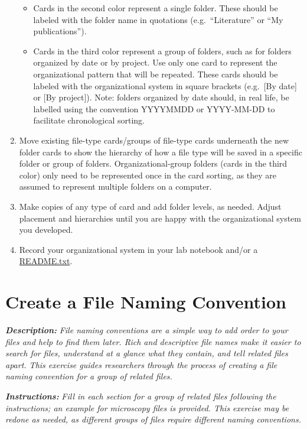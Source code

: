 \documentclass[
]{book}
\providecommand{\tightlist}{%
  \setlength{\itemsep}{0pt}\setlength{\parskip}{0pt}}
\begin{document}
\begin{enumerate}
  \begin{itemize}
  \tightlist
  \item
    Cards in the second color represent a single folder. These should be labeled with the folder name in quotations (e.g.~``Literature'' or ``My publications'').
  \item
    Cards in the third color represent a group of folders, such as for folders organized by date or by project. Use only one card to represent the organizational pattern that will be repeated. These cards should be labeled with the organizational system in square brackets (e.g.~{[}By date{]} or {[}By project{]}). Note: folders organized by date should, in real life, be labelled using the convention YYYYMMDD or YYYY-MM-DD to facilitate chronological sorting.
  \end{itemize}
\item
  Move existing file-type cards/groups of file-type cards underneath the new folder cards to show the hierarchy of how a file type will be saved in a specific folder or group of folders. Organizational-group folders (cards in the third color) only need to be represented once in the card sorting, as they are assumed to represent multiple folders on a computer.
\item
  Make copies of any type of card and add folder levels, as needed. Adjust placement and hierarchies until you are happy with the organizational system you developed.
\item
  Record your organizational system in your lab notebook and/or a \protect\hyperlink{readme-txt}{README.txt}.
\end{enumerate}

\hypertarget{file-naming}{%
\section{Create a File Naming Convention}\label{file-naming}}

\textbf{\emph{Description:}} \emph{File naming conventions are a simple way to add order to your files and help to find them later. Rich and descriptive file names make it easier to search for files, understand at a glance what they contain, and tell related files apart. This exercise guides researchers through the process of creating a file naming convention for a group of related files.}

\textbf{\emph{Instructions:}} \emph{Fill in each section for a group of related files following the instructions; an example for microscopy files is provided. This exercise may be redone as needed, as different groups of files require different naming conventions.}
\end{document}
